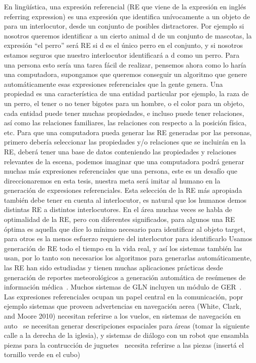 En ling\"u\'{i}stica, una expresi\'on referencial (RE que viene de la expresi\'on en ingl\'es referring expression) es una expresi\'on que identifica un\'ivocamente a un objeto de para un interlocutor, desde un conjunto de posibles distractores. Por ejemplo si nosotros queremos identificar a un cierto animal d de un conjunto de mascotas, la expresi\'on ``el perro'' ser\'a RE si d es el \'unico perro en el conjunto, y si nosotros estamos seguros que nuestro interlocutor identificar\'a a d como un perro. Para una persona esto ser\'ia una tarea f\'acil de realizar, pensemos ahora como lo har\'ia una computadora, supongamos que queremos conseguir un algoritmo que genere autom\'aticamente esas expresiones referenciales que la gente genera. Una propiedad es una caracter\'istica de una entidad particular por ejemplo, la raza de un perro, el tener o no tener bigotes para un hombre, o el color para un objeto, cada entidad puede tener muchas propiedades, e incluso puede tener relaciones, as\'i como las relaciones familiares, las relaciones con respecto a la posici\'on f\'isica, etc. Para que una computadora pueda generar las RE generadas por las personas, primero deber\'ia seleccionar las propiedades y/o relaciones que se incluir\'an en la RE, deber\'a tener una base de datos conteniendo las propiedades y relaciones relevantes de la escena, podemos imaginar que una computadora podr\'a generar muchas m\'as expresiones referenciales que una persona, este es un desaf\'io que direccionaremos en esta tesis, nuestra meta ser\'a imitar al humano en la generaci\'on de expresiones referenciales. Esta selecci\'on de la RE m\'as apropiada tambi\'en debe tener en cuenta al interlocutor, es natural que los humanos demos distintas RE a distintos interlocutores. En el \'area muchas veces se habla de optimalidad de la RE, pero con diferentes significados, para algunos una RE \'optima es aquella que dice lo m\'inimo necesario para identificar al objeto target, para otros es la menos esfuerzo requiere del interlocutor para identificarlo
Usamos generaci\'on de RE todo el tiempo en la vida real, y as\'i los sistemas tambi\'en las usan, por lo tanto son necesarios los algoritmos para generarlas autom\'aticamente, las RE han sido estudiadas y tienen muchas aplicaciones pr\'acticas desde generaci\'on de reportes meteorol\'ogicos a generaci\'on autom\'atica de res\'umenes de informaci\'on m\'edica~\cite{dale2000}. Muchos sistemas de GLN incluyen un m\'odulo de GER~\cite{Mellish2004}.
Las expresiones referenciales ocupan un papel central en la comunicaci\'on, popr ejemplo sistemas que proveen advertencias en navegaci\'on aerea
 (White, Clark, and Moore 2010) necesitan referirse a los vuelos, en sistemas de navegaci\'on en auto~\cite{Drager:2012:GLN:2380816.2380908} se necesitan generar descripciones espaciales para \'areas (tomar la siguiente calle a la derecha de la iglesia), y sistemas de di\'alogo con un robot que ensambla piezas para la contrucci\'on de juguetes~\cite{foster-etal-ijcai2009} necesita referirse a las piezas (insert\'a el tornillo verde en el cubo)

